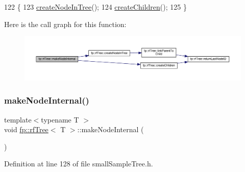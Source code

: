 \begin{DoxyCode}
122                                               \{
123                     \hyperlink{classfp_1_1rfTree_aaf9d8cdfbb1d10da53a375ea8204e393}{createNodeInTree}();
124                     \hyperlink{classfp_1_1rfTree_ad226037e7f93c0fa2a1a960e19a87bed}{createChildren}();
125                 \}
\end{DoxyCode}
Here is the call graph for this function\+:
\nopagebreak
\begin{figure}[H]
\begin{center}
\leavevmode
\includegraphics[width=350pt]{classfp_1_1rfTree_aaf7bbdde5f7313c3e84853bbf5fdf792_cgraph}
\end{center}
\end{figure}
\mbox{\label{classfp_1_1rfTree_aaf7bbdde5f7313c3e84853bbf5fdf792}} 
\subsubsection{\texorpdfstring{make\+Node\+Internal()}{makeNodeInternal()}\hspace{0.1cm}{\footnotesize\ttfamily [2/2]}}
{\footnotesize\ttfamily template$<$typename T $>$ \\
void \hyperlink{classfp_1_1rfTree}{fp\+::rf\+Tree}$<$ T $>$\+::make\+Node\+Internal (\begin{DoxyParamCaption}{ }\end{DoxyParamCaption})\hspace{0.3cm}{\ttfamily [inline]}}



Definition at line 128 of file small\+Sample\+Tree.\+h.


